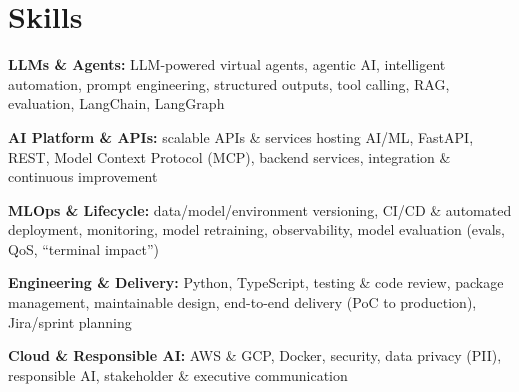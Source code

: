 \documentclass[10pt,a4paper]{article}
\begin{document}
\section{Skills}
\begin{tight}
  \item[\textcolor{accent}{\small$\bullet$}] \textbf{LLMs \& Agents:} LLM-powered virtual agents, agentic AI, intelligent automation, prompt engineering, structured outputs, tool calling, RAG, evaluation, LangChain, LangGraph
  \item[\textcolor{accent}{\small$\bullet$}] \textbf{AI Platform \& APIs:} scalable APIs \& services hosting AI/ML, FastAPI, REST, Model Context Protocol (MCP), backend services, integration \& continuous improvement
  \item[\textcolor{accent}{\small$\bullet$}] \textbf{MLOps \& Lifecycle:} data/model/environment versioning, CI/CD \& automated deployment, monitoring, model retraining, observability, model evaluation (evals, QoS, ``terminal impact'')
  \item[\textcolor{accent}{\small$\bullet$}] \textbf{Engineering \& Delivery:} Python, TypeScript, testing \& code review, package management, maintainable design, end-to-end delivery (PoC to production), Jira/sprint planning
  \item[\textcolor{accent}{\small$\bullet$}] \textbf{Cloud \& Responsible AI:} AWS \& GCP, Docker, security, data privacy (PII), responsible AI, stakeholder \& executive communication
\end{tight}

\end{document}

